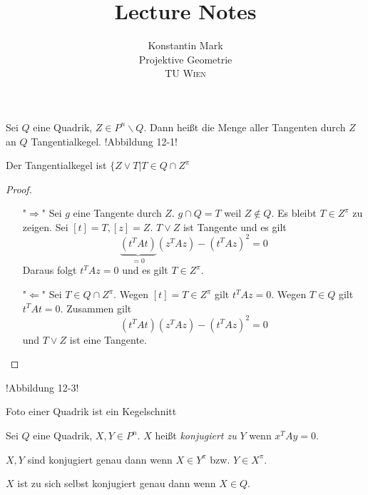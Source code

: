 \documentclass[11pt]{article}
\title{Lecture Notes}
\author{Konstantin Mark\\
Projektive Geometrie\\ 
\textsc{TU Wien}
}
\begin{document}
\maketitle

\begin{definition}
Sei $Q$ eine Quadrik, $Z\in P^n\backslash Q$. Dann heißt die Menge aller Tangenten durch $Z$ an $Q$ Tangentialkegel. !Abbildung 12-1!
\end{definition}

\begin{theorem}
Der Tangentialkegel ist $\{Z\lor T | T\in Q\cap Z^\pi$
\end{theorem}
\begin{proof}
\begin{enumerate}
    \item ["$\Rightarrow$"] Sei $g$ eine Tangente durch $Z$. $g\cap Q = T$ weil $Z\notin Q$. Es bleibt $T\in Z^\pi$ zu zeigen. Sei $[t] = T, [z] = Z$. $T\lor Z$ ist Tangente und es gilt \begin{equation*}
        \underbrace{(t^TAt)}_{=0}(z^TAz) - (t^TAz)^2 = 0
    \end{equation*}
    Daraus folgt $t^TAz = 0$ und es gilt $T\in Z^\pi$.
    \item ["$\Leftarrow$"] Sei $T\in Q\cap Z^\pi$. Wegen $[t]= T\in Z^\pi$ gilt $t^TAz = 0$. Wegen $T\in Q$ gilt $t^TAt=0$. Zusammen gilt \begin{equation*}
        (t^TAt)(z^TAz) - (t^TAz)^2 = 0
    \end{equation*} und $T\lor Z$ ist eine Tangente.
\end{enumerate}
\end{proof}
\begin{remark}
!Abbildung 12-3!
\end{remark}
\begin{remark}
Foto einer Quadrik ist ein Kegelschnitt
\end{remark}

\begin{definition}
Sei $Q$ eine Quadrik, $X,Y\in P^n$. $X$ heißt \textit{konjugiert zu} $Y$ wenn $x^TAy = 0$.
\end{definition}
\begin{remark}
$X,Y$ sind konjugiert genau dann wenn $X\in Y^\pi$ bzw. $Y\in X^\pi$.
\end{remark}

\begin{remark}
$X$ ist zu sich selbst konjugiert genau dann wenn $X\in Q$.
\end{remark}
\end{document}

